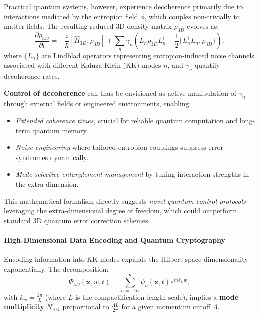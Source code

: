 \documentclass[12pt]{article}
\begin{document}
Practical quantum systems, however, experience decoherence primarily due to interactions mediated by the entropion field \(\phi\), which couples non-trivially to matter fields. The resulting reduced 3D density matrix \(\rho_{3D}\) evolves as:
\begin{equation}
\frac{\partial \rho_{3D}}{\partial t} = -\frac{i}{\hbar} [\hat{H}_{3D}, \rho_{3D}] + \sum_n \gamma_n \left( L_n \rho_{3D} L_n^\dagger - \frac{1}{2} \{ L_n^\dagger L_n, \rho_{3D} \} \right),
\label{eq:master_equation_detailed}
\end{equation}
where \(\{L_n\}\) are Lindblad operators representing entropion-induced noise channels associated with different Kaluza-Klein (KK) modes \(n\), and \(\gamma_n\) quantify decoherence rates.

\textbf{Control of decoherence} can thus be envisioned as active manipulation of \(\gamma_n\) through external fields or engineered environments, enabling:

\begin{itemize}
    \item \emph{Extended coherence times}, crucial for reliable quantum computation and long-term quantum memory.
    \item \emph{Noise engineering} where tailored entropion couplings suppress error syndromes dynamically.
    \item \emph{Mode-selective entanglement management} by tuning interaction strengths in the extra dimension.
\end{itemize}

This mathematical formalism directly suggests \emph{novel quantum control protocols} leveraging the extra-dimensional degree of freedom, which could outperform standard 3D quantum error correction schemes.

\paragraph{High-Dimensional Data Encoding and Quantum Cryptography}

Encoding information into KK modes expands the Hilbert space dimensionality exponentially. The decomposition:
\begin{equation}
\Psi_{4D}(\mathbf{x}, w, t) = \sum_{n=-\infty}^\infty \psi_n(\mathbf{x}, t) e^{i n k_w w},
\label{eq:KK_decomposition}
\end{equation}
with \(k_w = \frac{2\pi}{L}\) (where \(L\) is the compactification length scale), implies a \textbf{mode multiplicity} \(N_{\mathrm{KK}}\) proportional to \(\frac{\Lambda L}{2\pi}\) for a given momentum cutoff \(\Lambda\).
\end{document}
